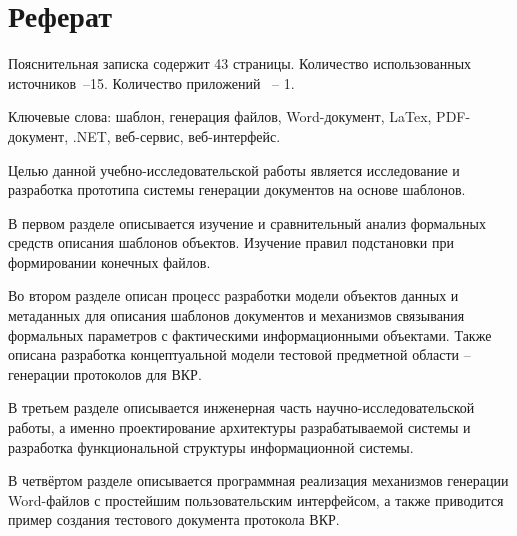 \chapter*{Реферат}
\thispagestyle{plain}

Пояснительная записка содержит 43 страницы.   Количество использованных источников~--15. Количество приложений ~-- 1.

Ключевые слова: шаблон, генерация файлов, Word-документ, LaTex, PDF-документ, .NET,  веб-сервис, веб-интерфейс.

    Целью данной учебно-исследовательской работы является исследование и разработка прототипа системы генерации документов на основе шаблонов.
    
    В первом разделе описывается изучение и сравнительный анализ формальных средств описания шаблонов объектов. Изучение правил подстановки при формировании конечных файлов.
             
Во втором разделе описан процесс разработки модели объектов данных и метаданных для описания шаблонов документов и механизмов связывания формальных параметров с фактическими информационными объектами. Также описана разработка концептуальной модели тестовой предметной области – генерации протоколов для ВКР.

    В третьем разделе описывается инженерная часть научно-исследовательской работы, а именно проектирование архитектуры разрабатываемой системы и разработка функциональной структуры информационной системы.
    
    В четвёртом разделе описывается программная реализация механизмов генерации Word-файлов с простейшим пользовательским интерфейсом, а также приводится пример создания тестового документа протокола ВКР.

